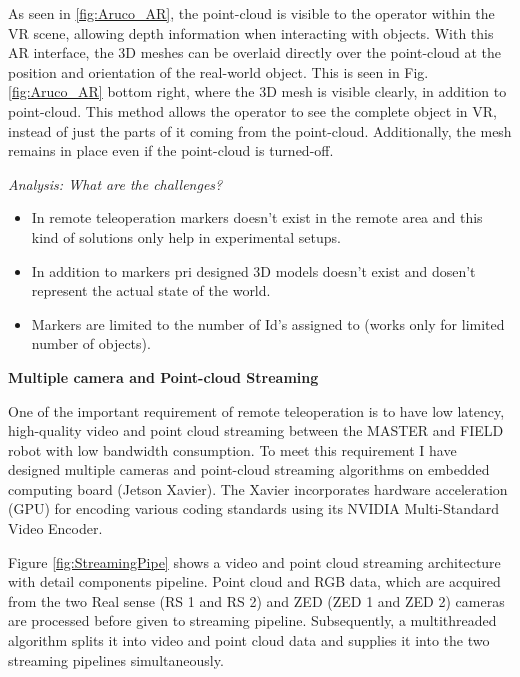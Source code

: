 As  seen  in \ref{fig:Aruco_AR},  the  point-cloud  is  visible  to  the  operator  within the VR scene, allowing depth information when interacting with objects. With this AR interface,  the  3D  meshes  can  be  overlaid  directly  over  the  point-cloud at  the  position  and  orientation  of  the  real-world  object.  This  is  seen  in  Fig. \ref{fig:Aruco_AR} bottom right,  where  the  3D  mesh  is  visible  clearly, in addition to point-cloud. This method allows the operator to see the complete object in  VR,  instead  of  just  the  parts  of  it  coming  from  the  point-cloud.  Additionally,  the  mesh  remains in place even if the point-cloud is turned-off.

\textit{Analysis: What are the challenges?}
\begin{itemize}
    \item In remote teleoperation markers doesn't exist in the remote area and this kind of solutions only help in experimental setups.
    \item In addition to markers pri designed 3D models doesn't exist and dosen't represent the actual state of the world.
    \item Markers are limited to the number of Id's assigned to (works only for limited  number of objects).
\end{itemize}


\textbf{Multiple camera and Point-cloud Streaming}

One of the important requirement of remote teleoperation is to have low latency, high-quality video and point cloud streaming between the MASTER and FIELD robot with low bandwidth consumption. To meet this requirement I have designed multiple cameras and point-cloud streaming algorithms on embedded computing board (Jetson Xavier). The Xavier incorporates hardware acceleration (GPU) for encoding various coding standards using its NVIDIA Multi-Standard Video Encoder.

Figure \ref{fig:StreamingPipe} shows a video and point cloud streaming architecture with detail components pipeline. Point cloud and RGB data, which are acquired from the two Real sense (RS 1 and RS 2) and ZED (ZED 1 and ZED 2) cameras are processed before given to streaming pipeline. Subsequently, a multithreaded algorithm splits it into video and point cloud data and supplies it into the two streaming pipelines simultaneously. 

